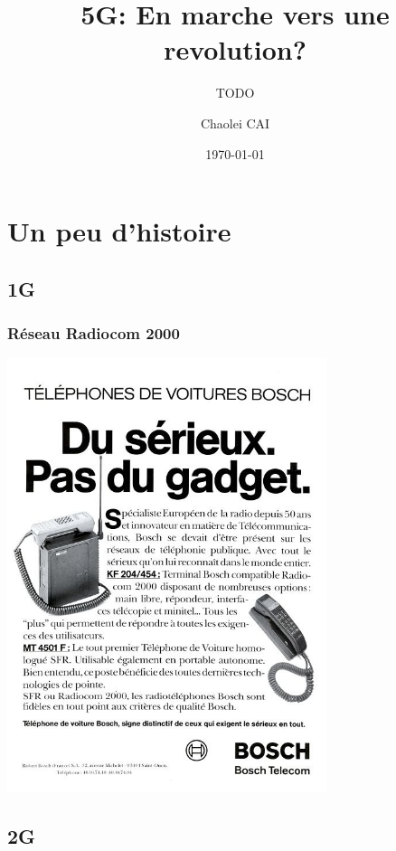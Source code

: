 \documentclass{beamer}
\subtitle{TODO}
\title{5G: En marche vers une revolution?}
\institute[Paris 8]{Paris VIII}
\author{Chaolei CAI}
\date{\today}
\begin{document}
    \frame{\titlepage}
    \tableofcontents

    \section{Un peu d'histoire}

    \subsection{1G}
    \begin{frame}
        \frametitle{Réseau Radiocom 2000}
        \includegraphics[width=0.70\textwidth,height=0.9\textheight]{img/bosch.jpg}
    \end{frame}

    \subsection{2G}
\end{document}
